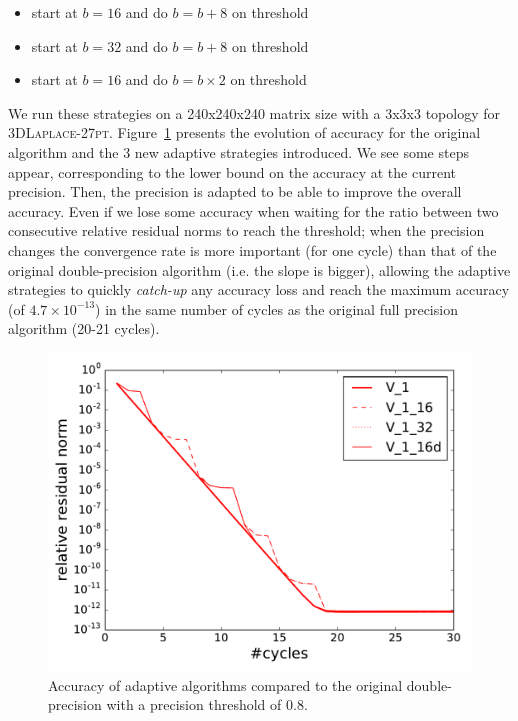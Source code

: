 \begin{itemize}

    \item start at $b=16$ and do $b=b+8$ on threshold

    \item start at $b=32$ and do $b=b+8$ on threshold

    \item start at $b=16$ and do $b=b\times2$ on threshold

\end{itemize}

We run these strategies on a 240x240x240 matrix size with a 3x3x3 topology for
\textsc{3DLaplace-27pt}. Figure~\ref{fig.prec_incr} presents the evolution of
accuracy for the original algorithm and the 3 new adaptive strategies
introduced.  We see some steps appear, corresponding to the lower bound on the
accuracy at the current precision. Then, the precision is adapted to be able to
improve the overall accuracy. Even if we lose some accuracy when waiting for
the ratio between two consecutive relative residual norms to reach the
threshold; when the precision changes the convergence rate is more important
(for one cycle) than that of the original double-precision algorithm (i.e. the
slope is bigger), allowing the adaptive strategies to quickly \emph{catch-up}
any accuracy loss and reach the maximum accuracy (of $4.7\times 10^{-13}$) in
the same number of cycles as the original full precision algorithm (20-21
cycles).

\begin{figure}[htb]
    \centering
    \includegraphics[width=0.9\linewidth]{figs/prec_incr.pdf}
    \caption{Accuracy of adaptive algorithms compared to the original
    double-precision with a precision threshold of $0.8$.}
    \label{fig.prec_incr}
\end{figure}

